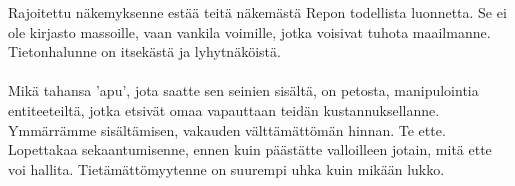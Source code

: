 \documentclass{article}
\begin{document}
\begin{infobox}
Rajoitettu näkemyksenne estää teitä näkemästä Repon todellista luonnetta. Se ei ole kirjasto massoille, vaan vankila voimille, jotka voisivat tuhota maailmanne. Tietonhalunne on itsekästä ja lyhytnäköistä.\\
\\
Mikä tahansa 'apu', jota saatte sen seinien sisältä, on petosta, manipulointia entiteeteiltä, jotka etsivät omaa vapauttaan teidän kustannuksellanne. Ymmärrämme sisältämisen, vakauden välttämättömän hinnan. Te ette. Lopettakaa sekaantumisenne, ennen kuin päästätte valloilleen jotain, mitä ette voi hallita. Tietämättömyytenne on suurempi uhka kuin mikään lukko.
\end{infobox}
\end{document}
